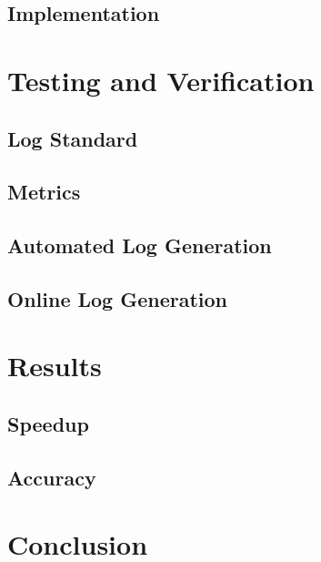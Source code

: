 \documentclass[mscthesis]{usiinfthesis}
\begin{document}
\section{Implementation}

\chapter{Testing and Verification}
\section{Log Standard}
\section{Metrics}
\section{Automated Log Generation}
\section{Online Log Generation}

\chapter{Results}
\section{Speedup}
\section{Accuracy}

\chapter{Conclusion}
\end{document}
